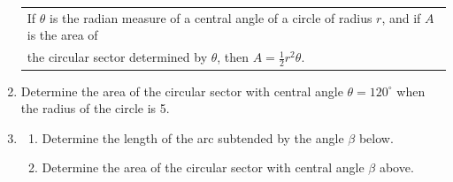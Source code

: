 \begin{enumerate}
\begin{tabular}{| l |}\hline
If $\theta$ is the radian measure of a central angle of a circle of radius $r$, and if $A$ is the area of \\the circular sector determined by $\theta$, then $A = \frac{1}{2}r^2 \theta$.  \\ \hline
\end{tabular} 
\vspace{-.1in}
\item Determine the area of the circular sector with central angle $\theta = 120^\circ$ when the radius of the circle is 5. \\[.7in]



\item \begin{enumerate}
\item Determine the length of the arc subtended by the angle $\beta$ below. \\
 \vfill
\item Determine the area of the circular sector with central angle $\beta$ above. 
\end{enumerate}


\vfill









\end{enumerate}

